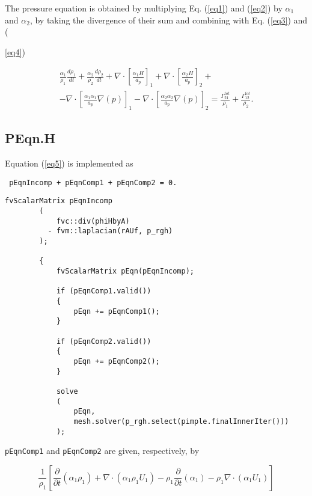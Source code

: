 \documentclass[a4paper, 12 pt, fleqn]{article}
\begin{document}
The pressure equation is obtained by multiplying Eq. (\ref{eq1}) and (\ref{eq2}) by $\alpha_1$ and $\alpha_2$, by taking the divergence of their sum and combining with Eq. (\ref{eq3}) and ({\ref{eq4})

\begin{eqnarray}\label{eq5}
\frac{\alpha_1}{\rho_1} \frac{d\rho_1}{dt} + \frac{\alpha_2}{\rho_2} \frac{d\rho_2}{dt} + \nabla \cdot \left[ \frac{\alpha_1 H}{a_p} \right]_1 + \nabla \cdot \left[ \frac{\alpha_2 H}{a_p} \right]_2 +\nonumber\\
-\nabla \cdot \left[ \frac{\alpha_1 \alpha_1}{a_p}\nabla(p) \right]_1 - \nabla \cdot \left[ \frac{\alpha_2 \alpha_2}{a_p}\nabla(p)  \right]_2  = \frac{\Gamma_{21}^{tot}}{\rho_1} + \frac{\Gamma_{12}^{tot}}{\rho_2}.
\end{eqnarray}

%
\subsection{PEqn.H}

Equation (\ref{eq5}) is implemented as 

\begin{verbatim}
 pEqnIncomp + pEqnComp1 + pEqnComp2 = 0.
\end{verbatim}

\begin{lstlisting}[frame=single]  
        fvScalarMatrix pEqnIncomp
        (
            fvc::div(phiHbyA)
          - fvm::laplacian(rAUf, p_rgh)
        );

        {
            fvScalarMatrix pEqn(pEqnIncomp);

            if (pEqnComp1.valid())
            {
                pEqn += pEqnComp1();
            }

            if (pEqnComp2.valid())
            {
                pEqn += pEqnComp2();
            }

            solve
            (
                pEqn,
                mesh.solver(p_rgh.select(pimple.finalInnerIter()))
            );
\end{lstlisting}\label{lst1}

 {\tt pEqnComp1} and {\tt pEqnComp2} are given, respectively, by
 
 \begin{equation}\label{eq1c}
\frac{1}{\rho_1}\left[ \frac{\partial}{\partial t}(\alpha_1 \rho_1) +\nabla \cdot\left({\alpha_1 \rho_1 U_1}\right)- \rho_1 \frac{\partial}{\partial t}(\alpha_1) - \rho_1 \nabla \cdot(\alpha_1 U_1) \right]
\end{equation}

}
\end{document}
